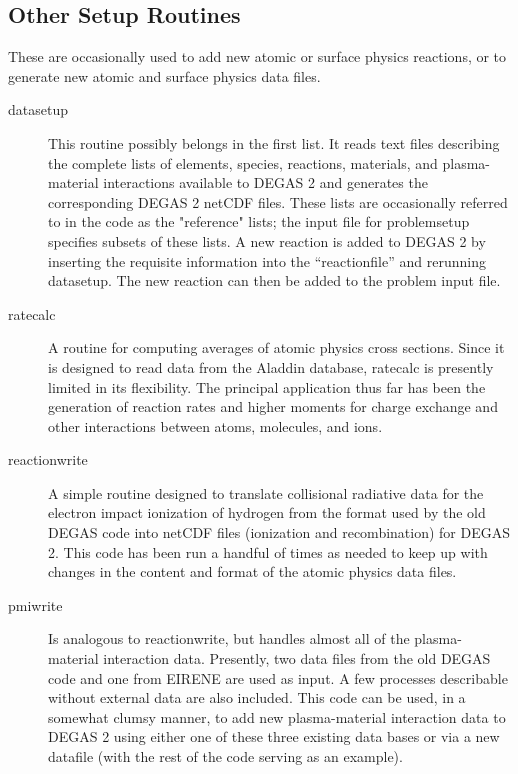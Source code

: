 \documentclass[12pt]{report}
\begin{document}
\subsection{Other Setup Routines}
\label{othersetup}

These are occasionally used to add new atomic
or surface physics reactions, or to generate new atomic and surface physics
data files.

\begin{description}
\item[datasetup] This routine possibly belongs in the first list. It
reads text files describing the complete lists of elements, species, reactions,
materials, and plasma-material interactions available to DEGAS 2 and generates
the corresponding DEGAS 2 netCDF files. These lists are occasionally referred 
to in the code as the "reference" lists; the input file for problemsetup
specifies subsets of these lists. A new reaction is added to DEGAS 2 by 
inserting the requisite information into the ``reactionfile'' 
and rerunning datasetup. The new reaction can
then be added to the problem input file.
\item[ratecalc] A routine for computing averages of atomic physics
cross sections. Since it is designed to read data from the Aladdin 
database, ratecalc is presently limited in its flexibility. The principal
application thus far has been the generation of reaction rates and higher
moments for charge exchange and other interactions between atoms, molecules,
and ions.
\item[reactionwrite] A simple routine designed to translate collisional
radiative data for the electron impact ionization of hydrogen from the
format used by the old DEGAS code into netCDF files (ionization and
recombination) for DEGAS 2. This code has been run a handful of times
as needed to keep up with changes in the content and format of the atomic
physics data files.
\item[pmiwrite] Is analogous to reactionwrite, but handles almost all
of the plasma-material interaction data. Presently, two data files from
the old DEGAS code and one from EIRENE are used as input. A few processes
describable without external data are also included. This code can be used,
in a somewhat clumsy manner, to add new plasma-material interaction data
to DEGAS 2 using either one of these three existing data bases or via
a new datafile (with the rest of the code serving as an example).

\end{description}
\end{document}
